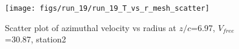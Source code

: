 \begin{figure}[H]
\centering
\texttt{[image: figs/run\_19/run\_19\_T\_vs\_r\_mesh\_scatter]}
\caption{Scatter plot of azimuthal velocity vs radius at $z/c$=6.97, $V_{free}$=30.87, station2}
\label{fig:run_19_T_vs_r_mesh_scatter}
\end{figure}


